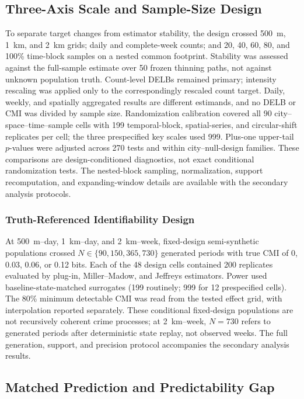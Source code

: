 \documentclass[applsci,article,accept,moreauthors]{Definitions/mdpi}
\begin{document}
\subsection{Three-Axis Scale and Sample-Size Design}
\label{subsec:e16_scale_methods}

{To separate target changes from estimator stability, the design crossed
500~m, 1~km, and 2~km grids; daily and complete-week counts; and 20, 40,
60, 80, and 100\% time-block samples on a nested common footprint. Stability
was assessed against the full-sample estimate over 50 frozen thinning paths,
not against unknown population truth. Count-level DELBs remained primary;
intensity rescaling was applied only to the correspondingly rescaled count
target. Daily, weekly, and spatially aggregated results are different
estimands, and no DELB or CMI was divided by sample size.
Randomization calibration covered all 90 city--space--time--sample cells
with 199 temporal-block, spatial-series, and circular-shift replicates per
cell; the three prespecified key scales used 999. Plus-one upper-tail
\(p\)-values were adjusted across 270 tests and within city--null-design
families. These comparisons are design-conditioned diagnostics, not exact
conditional randomization tests. The nested-block sampling, normalization,
support recomputation, and expanding-window details are available with the
secondary analysis protocols.}

\subsubsection*{Truth-Referenced Identifiability Design}
\label{subsec:e19_identifiability_methods}

{At 500~m--day, 1~km--day, and 2~km--week, fixed-design semi-synthetic
populations crossed \(N\in\{90,150,365,730\}\) generated periods with true
CMI of 0, 0.03, 0.06, or 0.12 bits. Each of the 48 design cells contained
200 replicates evaluated by plug-in, Miller--Madow, and Jeffreys estimators.
Power used baseline-state-matched surrogates (199 routinely; 999 for 12
prespecified cells). The 80\% minimum detectable CMI was read from the tested
effect grid, with interpolation reported separately. These conditional
fixed-design populations are not recursively coherent crime processes; at
2~km--week, \(N=730\) refers to generated periods after deterministic state
replay, not observed weeks. The full generation, support, and precision
protocol accompanies the secondary analysis results.}

\subsection{Matched Prediction and Predictability Gap}
\label{subsec:prediction_experiment}
\label{subsec:methods_prediction}
\end{document}
